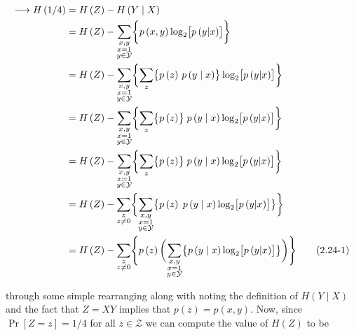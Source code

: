 \documentclass[ClusteringConnectionsMAIN.tex]{subfiles}
\begin{document}
\begin{align} \label{c2p24eq1}
\longrightarrow H \left( 1/4 \right) &= H \left( Z \right) - H \left( Y \mid X \right) \notag \\
&= H \left( Z \right) - \sum_{\substack{x, y \\ x = 1 \\ y \in \mathcal{Y}}} \biggl\{ p \left( x, y \right) \log_2 \bigl[ p \left( y | x \right) \bigr] \biggr\}  \notag \\
&= H \left( Z \right) - \sum_{\substack{x, y \\ x = 1 \\ y \in \mathcal{Y}}} \biggl\{ \sum_{z} \bigl\{ p \left( z \right) \, p \left( y \mid x \right) \bigr\} \log_2 \bigl[ p \left( y | x \right) \bigr] \biggr\}  \notag \\
&= H \left( Z \right) - \sum_{\substack{x, y \\ x = 1 \\ y \in \mathcal{Y}}} \biggl\{ \sum_{z} \bigl\{ p \left( z \right) \bigr\} \; p \left( y \mid x \right) \log_2 \bigl[ p \left( y | x \right) \bigr] \biggr\}  \notag \\
&= H \left( Z \right) - \sum_{\substack{x, y \\ x = 1 \\ y \in \mathcal{Y}}} \biggl\{ \sum_z \bigl\{ p \left( z \right) \bigr\} \; p \left( y \mid x \right) \log_2 \bigl[ p \left( y | x \right) \bigr] \biggr\}  \notag \\
&= H \left( Z \right) - \sum_{\substack{z \\ z \neq 0}}  \biggl\{ \sum_{\substack{x, y \\ x = 1 \\ y \in \mathcal{Y}}} \bigl\{ p \left( z \right) \; p \left( y \mid x \right) \log_2 \bigl[ p \left( y | x \right) \bigr] \bigr\} \biggr\}  \notag \\
&= H \left( Z \right) - \sum_{\substack{z \\ z \neq 0}} \Biggl\{ p \left( z \right) \biggl( \sum_{\substack{x, y \\ x = 1 \\ y \in \mathcal{Y}}} \bigl\{ p \left( y \mid x \right) \log_2 \bigl[ p \left( y | x \right) \bigr] \bigr\} \biggr) \Biggr\} \tag{2.24-1}
\end{align}

through some simple rearranging along with noting the definition of $H \left( Y \mid X \right)$ and the fact that $Z = X Y$ implies that $p \left( z \right) = p \left( x, y \right)$.  Now, since $\Pr \left[ Z = z \right] = 1 / 4$ for all $z \in \mathcal{Z}$ we can compute the value of $H \left( Z \right)$ to be
\end{document}
